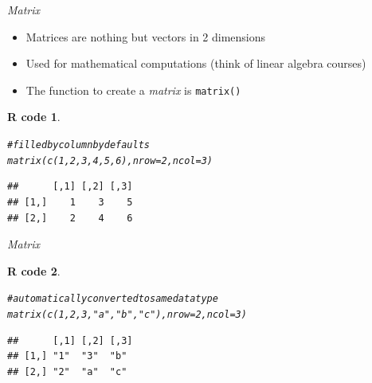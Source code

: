 \documentclass[11pt]{beamer}\usepackage[]{graphicx}\usepackage[]{color}
\makeatletter
\newcommand{\hlnum}[1]{\textcolor[rgb]{0.063,0.58,0.627}{#1}}%
\newcommand{\hlstr}[1]{\textcolor[rgb]{0.063,0.58,0.627}{#1}}%
\newcommand{\hlcom}[1]{\textcolor[rgb]{0.588,0.588,0.588}{#1}}%
\newcommand{\hlstd}[1]{\textcolor[rgb]{0.196,0.196,0.196}{#1}}%
\newcommand{\hlkwc}[1]{\textcolor[rgb]{0,0.631,0.314}{#1}}%
\newcommand{\hlkwd}[1]{\textcolor[rgb]{0.78,0.227,0.412}{#1}}%
\newenvironment{kframe}{%
 \def\at@end@of@kframe{}%
 \ifinner\ifhmode%
  \def\at@end@of@kframe{\end{minipage}}%
  \begin{minipage}{\columnwidth}%
 \fi\fi%
 \def\FrameCommand##1{\hskip\@totalleftmargin \hskip-\fboxsep
 \colorbox{shadecolor}{##1}\hskip-\fboxsep
     \hskip-\linewidth \hskip-\@totalleftmargin \hskip\columnwidth}%
 \MakeFramed {\advance\hsize-\width
   \@totalleftmargin\z@ \linewidth\hsize
   \@setminipage}}%
 {\par\unskip\endMakeFramed%
 \at@end@of@kframe}
\newenvironment{knitrout}{}{} %
\newtheorem{rcode}{R code}[section]
\newcommand{\code}[1]{\texttt{#1}}
\makeatother
\begin{document}
\begin{frame}[fragile]{\textit{Matrix}}

\begin{itemize}
  \setlength\itemsep{1em}
\item Matrices are nothing but vectors in 2 dimensions
\pause \item Used for mathematical computations (think of linear algebra courses)
\pause \item The function to create a \textit{matrix} is \code{matrix()}
\end{itemize}
\pause
\begin{knitrout}
\color{fgcolor}\begin{kframe}
\begin{rcode}\label{unnamed-chunk-19}\begin{alltt}
\hlcom{# filled by column by defaults}
\hlkwd{matrix}\hlstd{(}\hlkwd{c}\hlstd{(}\hlnum{1}\hlstd{,}\hlnum{2}\hlstd{,}\hlnum{3}\hlstd{,}\hlnum{4}\hlstd{,}\hlnum{5}\hlstd{,}\hlnum{6}\hlstd{),} \hlkwc{nrow} \hlstd{=} \hlnum{2}\hlstd{,} \hlkwc{ncol} \hlstd{=} \hlnum{3}\hlstd{)}
\end{alltt}
\begin{verbatim}
##      [,1] [,2] [,3]
## [1,]    1    3    5
## [2,]    2    4    6
\end{verbatim}
\end{rcode}\end{kframe}
\end{knitrout}

\end{frame}


\begin{frame}[fragile]{\textit{Matrix}}

\begin{knitrout}
\color{fgcolor}\begin{kframe}
\begin{rcode}\label{unnamed-chunk-20}\begin{alltt}
\hlcom{# automatically converted to same data type}
\hlkwd{matrix}\hlstd{(}\hlkwd{c}\hlstd{(}\hlnum{1}\hlstd{,}\hlnum{2}\hlstd{,}\hlnum{3}\hlstd{,}\hlstr{"a"}\hlstd{,}\hlstr{"b"}\hlstd{,}\hlstr{"c"}\hlstd{),} \hlkwc{nrow} \hlstd{=} \hlnum{2}\hlstd{,} \hlkwc{ncol} \hlstd{=} \hlnum{3}\hlstd{)}
\end{alltt}
\begin{verbatim}
##      [,1] [,2] [,3]
## [1,] "1"  "3"  "b" 
## [2,] "2"  "a"  "c"
\end{verbatim}
\end{rcode}\end{kframe}
\end{knitrout}

\end{frame}
\end{document}
